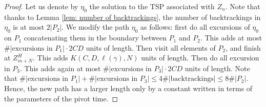 \begin{proof}
	Let us denote by $\eta_0$ the solution to the TSP associated with $Z_n$. Note that thanks to Lemma \ref{lem: number of backtrackings}, the number of backtrackings in $\eta_0$ is at most $2|P_2|$.
	We modify the path $\eta_0$ as follows: first do all excursions of $\eta_0$ on $P_1$ concatenating them in the boundary between $P_1$ and $P_2$. This adds at most $\#|\text{excursions in }P_1|\cdot 2CD$ units of length. Then visit all elements of $P_2$, and finish at $Z_{m+N}^H$. This adds $K(C,D,\ell(\gamma),N)$ units of length. Then do all excursion in $P_3$. This adds again at most $\#|\text{excursions in }P_3|\cdot 2CD$ units of length. Note that $\#|\text{excursions in }P_1|+\#|\text{excursions in }P_3|\le 4\#|\text{backtrackings}|\le 8\#|P_2|$. Hence, the new path has a larger length only by a constant written in terms of the parameters of the pivot time.
	
	
%	
\end{proof}

